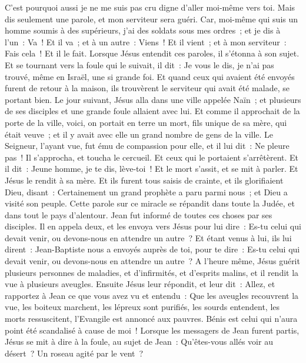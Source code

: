 \begin{multicols}{2}
C'est pourquoi aussi je ne me suis pas cru digne d'aller moi-même vers toi. Mais dis seulement une parole, et mon serviteur sera guéri.
Car, moi-même qui suis un homme soumis à des supérieurs, j'ai des soldats sous mes ordres~; et je dis à l'un~: Va~! Et il va~; et à un autre~: Viens~! Et il vient~; et à mon serviteur~: Fais cela~! Et il le fait.
Lorsque Jésus entendit ces paroles, il s'étonna à son sujet. Et se tournant vers la foule qui le suivait, il dit~: Je vous le dis, je n'ai pas trouvé, même en Israël, une si grande foi.
Et quand ceux qui avaient été envoyés furent de retour à la maison, ils trouvèrent le serviteur qui avait été malade, se portant bien.
Le jour suivant, Jésus alla dans une ville appelée Naïn~; et plusieurs de ses disciples et une grande foule allaient avec lui.
Et comme il approchait de la porte de la ville, voici, on portait en terre un mort, fils unique de sa mère, qui était veuve~; et il y avait avec elle un grand nombre de gens de la ville.
Le Seigneur, l'ayant vue, fut ému de compassion pour elle, et il lui dit~: Ne pleure pas~!
Il s'approcha, et toucha le cercueil. Et ceux qui le portaient s'arrêtèrent. Et il dit~: Jeune homme, je te dis, lève-toi~!
Et le mort s'assit, et se mit à parler. Et Jésus le rendit à sa mère.
Et ils furent tous saisis de crainte, et ils glorifiaient Dieu, disant~: Certainement un grand prophète a paru parmi nous~; et Dieu a visité son peuple.
Cette parole sur ce miracle se répandit dans toute la Judée, et dans tout le pays d'alentour.
Jean fut informé de toutes ces choses par ses disciples.
Il en appela deux, et les envoya vers Jésus pour lui dire~: Es-tu celui qui devait venir, ou devons-nous en attendre un autre~?
Et étant venus à lui, ils lui dirent~: Jean-Baptiste nous a envoyés auprès de toi, pour te dire~: Es-tu celui qui devait venir, ou devons-nous en attendre un autre~?
A l'heure même, Jésus guérit plusieurs personnes de maladies, et d'infirmités, et d'esprits malins, et il rendit la vue à plusieurs aveugles.
Ensuite Jésus leur répondit, et leur dit~: Allez, et rapportez à Jean ce que vous avez vu et entendu~: Que les aveugles recouvrent la vue, les boiteux marchent, les lépreux sont purifiés, les sourds entendent, les morts ressuscitent, l'Evangile est annoncé aux pauvres.
Bénis est celui qui n'aura point été scandalisé à cause de moi~!
Lorsque les messagers de Jean furent partis, Jésus se mit à dire à la foule, au sujet de Jean~: Qu'êtes-vous allés voir au désert~? Un roseau agité par le vent~?

\end{multicols}
